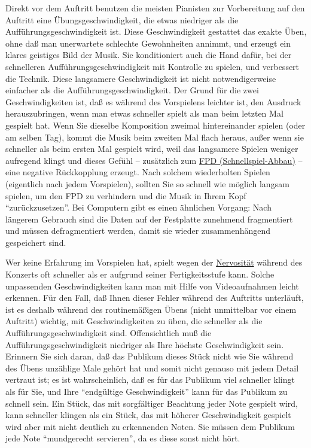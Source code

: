 Direkt vor dem Auftritt benutzen die meisten Pianisten zur Vorbereitung auf den Auftritt eine Übungsgeschwindigkeit, die etwas niedriger als die Aufführungsgeschwindigkeit ist.
Diese Geschwindigkeit gestattet das exakte Üben, ohne daß man unerwartete schlechte Gewohnheiten annimmt, und erzeugt ein klares geistiges Bild der Musik.
Sie konditioniert auch die Hand dafür, bei der schnelleren Aufführungsgeschwindigkeit mit Kontrolle zu spielen, und verbessert die Technik.
Diese langsamere Geschwindigkeit ist nicht notwendigerweise einfacher als die Aufführungsgeschwindigkeit.
Der Grund für die zwei Geschwindigkeiten ist, daß es während des Vorspielens leichter ist, den Ausdruck herauszubringen, wenn man etwas schneller spielt als man beim letzten Mal gespielt hat.
Wenn Sie dieselbe Komposition zweimal hintereinander spielen (oder am selben Tag), kommt die Musik beim zweiten Mal flach heraus, außer wenn sie schneller als beim ersten Mal gespielt wird, weil das langsamere Spielen weniger aufregend klingt und dieses Gefühl -- zusätzlich zum \hyperref[fpd]{FPD (Schnellspiel-Abbau)} -- eine negative Rückkopplung erzeugt.
Nach solchem wiederholten Spielen (eigentlich nach jedem Vorspielen), sollten Sie so schnell wie möglich langsam spielen, um den FPD zu verhindern und die Musik in Ihrem Kopf \enquote{zurückzusetzen}.
Bei Computern gibt es einen ähnlichen Vorgang: Nach längerem Gebrauch sind die Daten auf der Festplatte zunehmend fragmentiert und müssen defragmentiert werden, damit sie wieder zusammenhängend gespeichert sind.

Wer keine Erfahrung im Vorspielen hat, spielt wegen der \hyperref[c1iii15]{Nervosität} während des Konzerts oft schneller als er aufgrund seiner Fertigkeitsstufe kann. 
Solche unpassenden Geschwindigkeiten kann man mit Hilfe von Videoaufnahmen leicht erkennen.
Für den Fall, daß Ihnen dieser Fehler während des Auftritts unterläuft, ist es deshalb während des routinemäßigen Übens (nicht unmittelbar vor einem Auftritt) wichtig, mit Geschwindigkeiten zu üben, die schneller als die Aufführungsgeschwindigkeit sind.
Offensichtlich muß die Aufführungsgeschwindigkeit niedriger als Ihre höchste Geschwindigkeit sein.
Erinnern Sie sich daran, daß das Publikum dieses Stück nicht wie Sie während des Übens unzählige Male gehört hat und somit nicht genauso mit jedem Detail vertraut ist; es ist wahrscheinlich, daß es für das Publikum viel schneller klingt als für Sie, und Ihre \enquote{endgültige Geschwindigkeit} kann für das Publikum zu schnell sein.
Ein Stück, das mit sorgfältiger Beachtung jeder Note gespielt wird, kann schneller klingen als ein Stück, das mit höherer Geschwindigkeit gespielt wird aber mit nicht deutlich zu erkennenden Noten.
Sie müssen dem Publikum jede Note \enquote{mundgerecht servieren}, da es diese sonst nicht hört.

